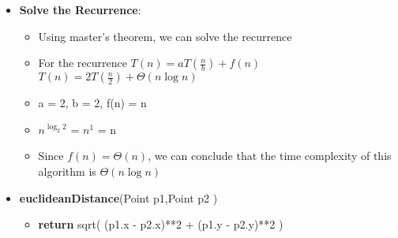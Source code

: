 \documentclass{article}[12pt]
\begin{document}
\begin{itemize}
  \item \textbf{Solve the Recurrence}:
    \begin{itemize}
      \item Using master's theorem, we can solve the recurrence
      \item For the recurrence $T(n) = aT(\frac{n}{b}) + f(n)$ \Rightarrow $T(n) = 2T(\frac{n}{2}) + \Theta(n \log n)$
      \item a = 2, b = 2, f(n) = n
      \item $n^{\log_{2} 2}$ = $n^{1}$ = n
      \item Since $f(n) = \Theta(n)$, we can conclude that
        the time complexity of this algorithm is $\Theta(n \log n)$
    \end{itemize}
  \item \textbf{euclideanDistance}(Point p1,Point p2 )
    \begin{itemize}
      \item \textbf{return} sqrt( (p1.x - p2.x)**2 + (p1.y - p2.y)**2 )
    \end{itemize}
\end{itemize}

\pagebreak
\end{document}
